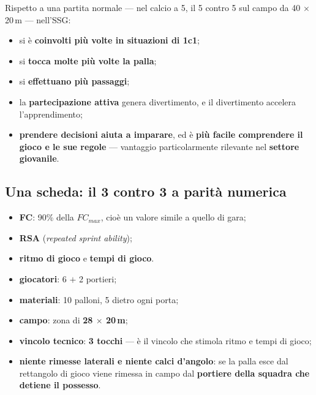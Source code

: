 Rispetto a una partita normale --- nel calcio a 5, il 5 contro 5 sul campo da 40 $\times$ 20\,m ---
nell'SSG:

\begin{itemize}
  \item si è \textbf{coinvolti più volte in situazioni di 1c1};
  \item si \textbf{tocca molte più volte la palla};
  \item si \textbf{effettuano più passaggi};
  \item la \textbf{partecipazione attiva} genera divertimento, e il divertimento accelera
    l'apprendimento;
  \item \textbf{prendere decisioni aiuta a imparare}, ed è \textbf{più facile comprendere il gioco e
    le sue regole} --- vantaggio particolarmente rilevante nel \textbf{settore giovanile}.
\end{itemize}

\subsection{Una scheda: il 3 contro 3 a parità numerica}

\begin{itemize}
  \item \textbf{FC}: 90\% della $FC_{max}$, cioè un valore simile a quello di gara;
  \item \textbf{RSA} (\textit{repeated sprint ability});
  \item \textbf{ritmo di gioco} e \textbf{tempi di gioco}.
\end{itemize}

\begin{itemize}
  \item \textbf{giocatori}: 6 $+$ 2 portieri;
  \item \textbf{materiali}: 10 palloni, 5 dietro ogni porta;
  \item \textbf{campo}: zona di \textbf{28 $\times$ 20\,m};
  \item \textbf{vincolo tecnico}: \textbf{3 tocchi} --- è il vincolo che stimola ritmo e tempi di
    gioco;
  \item \textbf{niente rimesse laterali e niente calci d'angolo}: se la palla esce dal rettangolo di
    gioco viene rimessa in campo dal \textbf{portiere della squadra che detiene il possesso}.
\end{itemize}

